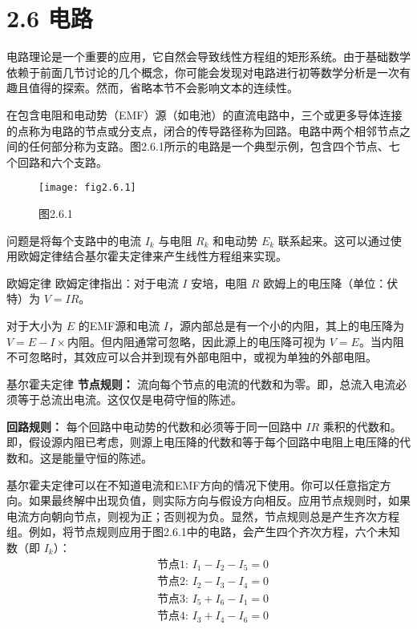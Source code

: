 \section*{2.6 电路}
电路理论是一个重要的应用，它自然会导致线性方程组的矩形系统。由于基础数学依赖于前面几节讨论的几个概念，你可能会发现对电路进行初等数学分析是一次有趣且值得的探索。然而，省略本节不会影响文本的连续性。

在包含电阻和电动势（EMF）源（如电池）的直流电路中，三个或更多导体连接的点称为电路的节点或分支点，闭合的传导路径称为回路。电路中两个相邻节点之间的任何部分称为支路。图2.6.1所示的电路是一个典型示例，包含四个节点、七个回路和六个支路。

\begin{figure}[h]
    \centering
    \texttt{[image: fig2.6.1]} 
    \caption{图2.6.1}
    \label{fig:2.6.1}
\end{figure}

问题是将每个支路中的电流 \(I_k\) 与电阻 \(R_k\) 和电动势 \(E_k\) 联系起来。这可以通过使用欧姆定律结合基尔霍夫定律来产生线性方程组来实现。

\begin{bluebox}{欧姆定律}
欧姆定律指出：对于电流 \(I\) 安培，电阻 \(R\) 欧姆上的电压降（单位：伏特）为 \(V = IR\)。

对于大小为 \(E\) 的EMF源和电流 \(I\)，源内部总是有一个小的内阻，其上的电压降为 \(V = E - I \times \text{内阻}\)。但内阻通常可忽略，因此源上的电压降可视为 \(V = E\)。当内阻不可忽略时，其效应可以合并到现有外部电阻中，或视为单独的外部电阻。
\end{bluebox}

\begin{bluebox}{基尔霍夫定律}
\textbf{节点规则：} 流向每个节点的电流的代数和为零。即，总流入电流必须等于总流出电流。这仅仅是电荷守恒的陈述。

\textbf{回路规则：} 每个回路中电动势的代数和必须等于同一回路中 \(IR\) 乘积的代数和。即，假设源内阻已考虑，则源上电压降的代数和等于每个回路中电阻上电压降的代数和。这是能量守恒的陈述。
\end{bluebox}

基尔霍夫定律可以在不知道电流和EMF方向的情况下使用。你可以任意指定方向。如果最终解中出现负值，则实际方向与假设方向相反。应用节点规则时，如果电流方向朝向节点，则视为正；否则视为负。显然，节点规则总是产生齐次方程组。例如，将节点规则应用于图2.6.1中的电路，会产生四个齐次方程，六个未知数（即 \(I_k\)）：
\[
\begin{aligned}
&\text{节点1: } I_1 - I_2 - I_5 = 0 \\
&\text{节点2: } I_2 - I_3 - I_4 = 0 \\
&\text{节点3: } I_5 + I_6 - I_1 = 0 \\
&\text{节点4: } I_3 + I_4 - I_6 = 0
\end{aligned}
\]


